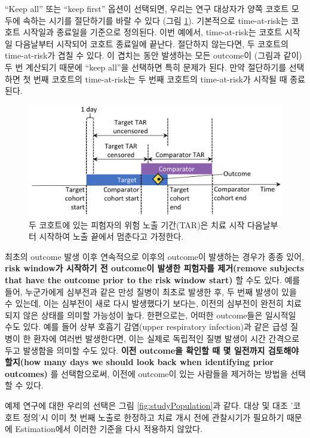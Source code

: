 \documentclass[11pt]{book}
\theoremstyle{definition}
\theoremstyle{definition}
\theoremstyle{definition}
\theoremstyle{remark}
\begin{document}
``Keep all'' 또는 ``keep first'' 옵션이 선택되면, 우리는 연구 대상자가
양쪽 코호트 모두에 속하는 시기를 절단하기를 바랄 수 있다 (그림
\ref{fig:tar}). 기본적으로 time-at-risk는 코호트 시작일과 종료일을
기준으로 정의된다. 이번 예에서, time-at-risk는 코호트 시작일 다음날부터
시작되어 코호트 종료일에 끝난다. 절단하지 않는다면, 두 코호트의
time-at-risk가 겹칠 수 있다. 이 겹치는 동안 발생하는 모든 outcome이
(그림과 같이) 두 번 계산되기 때문에 ``keep all''을 선택하면 특히 문제가
된다. 만약 절단하기를 선택하면 첫 번째 코호트의 time-at-risk는 두 번째
코호트의 time-at-risk가 시작될 때 종료된다.

\begin{figure}

{\centering \includegraphics[width=0.9\linewidth]{images/PopulationLevelEstimation/tar} 

}

\caption{두 코호트에 있는 피험자의 위험 노출 기간(TAR)은 치료 시작 다음날부터 시작하여 노출 끝에서 멈춘다고 가정한다.}\label{fig:tar}
\end{figure}

최초의 outcome 발생 이후 연속적으로 이후의 outcome이 발생하는 경우가
종종 있어, \textbf{risk window가 시작하기 전 outcome이 발생한 피험자를
제거(remove subjects that have the outcome prior to the risk window
start)} 할 수도 있다. 예를 들어, 누군가에게 심부전과 같은 만성 질병이
최초로 발생한 후, 두 번째 발생이 있을 수 있는데, 이는 심부전이 새로 다시
발생했다기 보다는, 이전의 심부전이 완전히 치료되지 않은 상태를 의미할
가능성이 높다. 한편으로는, 어떠한 outcome들은 일시적일 수도 있다. 예를
들어 상부 호흡기 감염(upper respiratory infection)과 같은 급성 질병이 한
환자에 여러번 발생한다면, 이는 실제로 독립적인 질병 발생이 시간 간격으로
두고 발생함을 의미할 수도 있다. \textbf{이전 outcome을 확인할 때 몇
일전까지 검토해야 할지(how many days we should look back when
identifying prior outcomes)} 를 선택함으로써, 이전에 outcome이 있는
사람들을 제거하는 방법을 선택할 수 있다.

예제 연구에 대한 우리의 선택은 그림 \ref{fig:studyPopulation}과 같다.
대상 및 대조 '코호트 정의'시 이미 첫 번째 노출로 한정하고 치료 개시 전에
관찰시기가 필요하기 때문에 Estimation에서 이러한 기준을 다시 적용하지
않았다.
\end{document}
